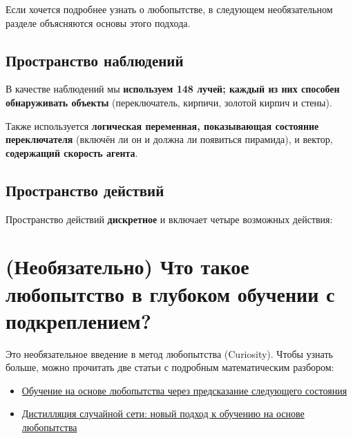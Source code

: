 \documentclass[11pt,a4paper]{article}
\begin{document}
Если хочется подробнее узнать о любопытстве, в следующем необязательном разделе объясняются основы этого подхода.

\subsection{Пространство наблюдений}\label{the-observation-space-1}

В качестве наблюдений мы \textbf{используем 148 лучей; каждый из них способен обнаруживать объекты} (переключатель, кирпичи, золотой кирпич и стены).


Также используется \textbf{логическая переменная, показывающая состояние переключателя} (включён ли он и должна ли появиться пирамида), и вектор, \textbf{содержащий скорость агента}.


\subsection{Пространство действий}\label{the-action-space-1}

Пространство действий \textbf{дискретное} и включает четыре возможных действия:


\section{(Необязательно) Что такое любопытство в глубоком обучении с подкреплением?}\label{optional-what-is-curiosity-in-deep-reinforcement-learning}

Это необязательное введение в метод любопытства (Curiosity). Чтобы узнать больше, можно прочитать две статьи с подробным математическим разбором:

\begin{itemize}
\tightlist
\item
  \href{https://medium.com/data-from-the-trenches/curiosity-driven-learning-through-next-state-prediction-f7f4e2f592fa}{Обучение на основе любопытства через предсказание следующего состояния}
\item
  \href{https://medium.com/data-from-the-trenches/curiosity-driven-learning-through-random-network-distillation-488ffd8e5938}{Дистилляция случайной сети: новый подход к обучению на основе любопытства}
\end{itemize}
\end{document}
